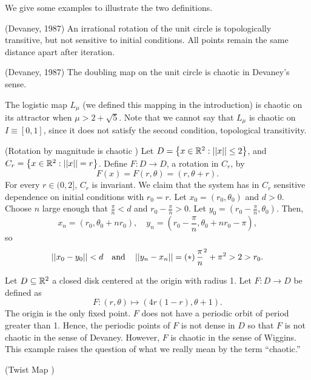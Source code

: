 \documentclass[12pt,draft,twoside]{book}
\begin{document}
We give some examples to illustrate the two definitions.
  \begin{example}
    (Devaney, 1987)
    An irrational rotation of the unit circle is topologically transitive, but not sensitive to initial conditions.
    All points remain the same distance apart after iteration.
  \end{example}
  \begin{example}
    (Devaney, 1987)
    The doubling map on the unit circle is chaotic in Devaney's sense.
  \end{example}
  \begin{example}
    The logistic map $L_\mu$ (we defined this mapping in the introduction) is chaotic on its attractor when $\mu > 2 + \sqrt{5}$.
    Note that we cannot say that $L_\mu$ is chaotic on $I \equiv [0,1]$, since it does not satisfy the second condition, topological transitivity.
  \end{example}
  \begin{example}
    (Rotation by magnitude is chaotic \citep{martelli})
    Let $D = \left \{ x \in \mathbb{R}^2: \left|\left| x \right|\right| \leq 2 \right \}$, and $C_r = \left \{ x \in \mathbb{R}^2: \left|\left| x \right|\right| = r \right \}$.
    Define $F: D \to D$, a rotation in $C_r$, by
    \begin{equation*}
      F(x) = F(r, \theta) = (r, \theta + r).
    \end{equation*}
    For every $r \in (0,2]$, $C_r$ is invariant.
    We claim that the system has in $C_r$ sensitive dependence on initial conditions with $r_0 = r$.
    Let $x_0 = (r_0, \theta_0)$ and $d > 0$.
    Choose $n$ large enough that $\frac{\pi}{n} < d$ and $r_0 - \frac{\pi}{n} > 0$.
    Let $y_0 = (r_0 - \frac{\pi}{n}, \theta_0)$.
    Then,
    \begin{equation*}
      x_n = (r_0, \theta_0 + nr_0),\quad
      y_n = (r_0 - \frac{\pi}{n}, \theta_0 + nr_0 - \pi),
    \end{equation*}
    so
    \begin{equation*}
      \left|\left| x_0 - y_0 \right|\right| < d \quad\mbox{and}\quad \left|\left| y_n - x_n \right|\right| = \left ( * \right ){\frac{\pi}{n}}^2 + \pi^2 > 2 > r_0.
    \end{equation*}
  \end{example}

  \begin{example}
    \citep{martelliarticle}
    Let $D \subseteq \mathbb{R}^2$ a closed disk centered at the origin with radius 1.
    Let $F: D \to D$ be defined as
    \begin{equation*}
      F: (r, \theta) \mapsto (4r(1 - r), \theta + 1).
    \end{equation*}
    The origin is the only fixed point.
    $F$ does not have a periodic orbit of period greater than 1.
    Hence, the periodic points of $F$ is not dense in $D$ so that $F$ is not chaotic in the sense of Devaney.
    However, $F$ is chaotic in the sense of Wiggins.
    This example raises the question of what we really mean by the term ``chaotic.''
  \end{example}
  \begin{example}
    (Twist Map \citep{wiggins})
  \end{example}
\end{document}
